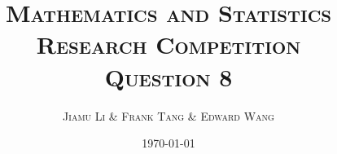 \usepackage{mathtools}
\usepackage{amssymb}
\usepackage{amsthm}
\usepackage{parskip}

\usepackage[p]{ETbb}
\usepackage[scaled=.95, type1]{cabin}
\usepackage[T1]{fontenc}
\usepackage[libertine, vvarbb]{newtxmath}
\usepackage{microtype}
\usepackage[bf, sc]{titlesec}

\usepackage{fancyhdr}
\pagestyle{fancy}
\fancyhf{}
\setlength{\headheight}{25pt}
\fancyhead[R]{\scshape \nouppercase{\leftmark}}
\fancyfoot[C]{\thepage}
\renewcommand{\footrulewidth}{1pt}
\fancypagestyle{plain}{
  \renewcommand{\headrulewidth}{0pt}
  \renewcommand{\footrulewidth}{0pt}
  \fancyhf{}
}

\usepackage[inline]{asymptote}
\def\asydir{asy}

\usepackage{caption}
\usepackage{float}
\usepackage{booktabs}
\usepackage{minted}
\usepackage{FiraMono}
\usepackage[usenames, svgnames, dvipsnames, table]{xcolor}
\usepackage{hyperref}



\newtheorem{theorem}{\scshape Theorem}
\newtheorem{problem}{\scshape Question}
\newtheorem{claim}{\scshape Claim}[theorem]
\DeclareMathOperator{\prob}{Pr}
\DeclarePairedDelimiter\floor{\lfloor}{\rfloor}

\title{\scshape {\Huge Mathematics and Statistics Research Competition} \\[1em] Question 8}

\author{\scshape Jiamu Li \& Frank Tang \& Edward Wang}

\date{\scshape \today}
